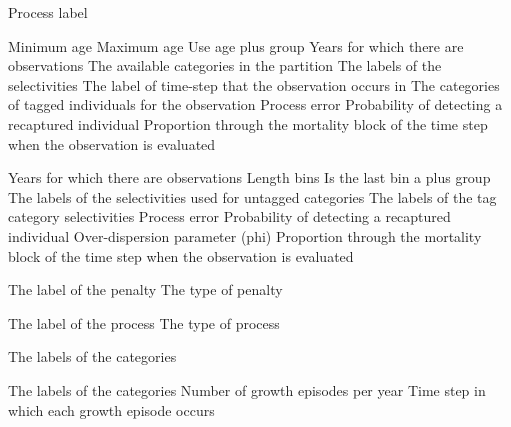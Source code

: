  {Process label}
\par\textbf{}\par
{} {Minimum age}
 {Maximum age}
 {Use age plus group}
 {Years for which there are observations}
 {The available categories in the partition}
 {The labels of the selectivities}
 {The label of time-step that the observation occurs in}
 {The categories of tagged individuals for the observation}
 {Process error}
 {Probability of detecting a recaptured individual}
 {Proportion through the mortality block of the time step when the observation is evaluated}
\par\textbf{}\par
{} {Years for which there are observations}
 {Length bins}
 {Is the last bin a plus group}
 {The labels of the selectivities used for untagged categories}
 {The labels of the tag category selectivities}
 {Process error}
 {Probability of detecting a recaptured individual}
 {Over-dispersion parameter (phi)}
 {Proportion through the mortality block of the time step when the observation is evaluated}
\par\par
{} {The label of the penalty}
 {The type of penalty}
\par\par
{} {The label of the process}
 {The type of process}
\par\textbf{}\par
{} {The labels of the categories}
\par\textbf{}\par
{} {The labels of the categories}
 {Number of growth episodes per year}
 {Time step in which each growth episode occurs}
